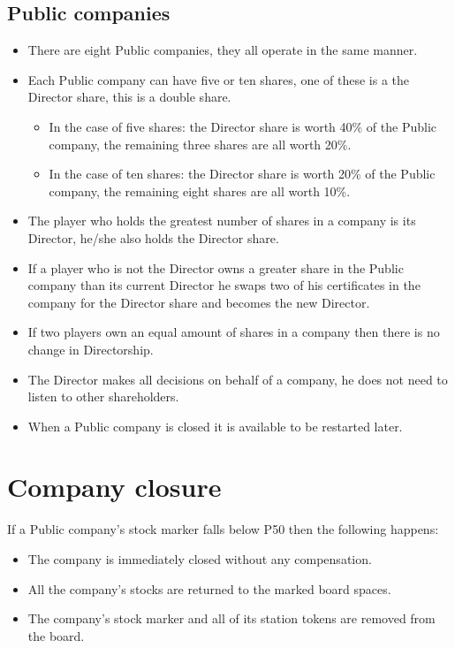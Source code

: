 \documentclass[a4paper]{article}
\begin{document}
\subsection{Public companies}
\begin{itemize}
	\item There are eight Public companies, they all operate in the same manner.
	\item Each Public company can have five or ten shares, one of these is a
	the Director share, this is a double share.
	\begin{itemize}
		\item In the case of five shares: the Director share is worth 40\% of
		the Public company, the remaining three shares are all worth 20\%.
		\item In the case of ten shares: the Director share is worth 20\% of
		the Public company, the remaining eight shares are all worth 10\%.
	\end{itemize}
	\item The player who holds the greatest number of shares in a company is its
	Director, he/she also holds the Director share.
	\item If a player who is not the Director owns a greater share in the Public
	company than its current Director he swaps two of his certificates in the
	company for the Director share and becomes the new Director.
	\item If two players own an equal amount of shares in a company then there
	is no change in Directorship.
	\item The Director makes all decisions on behalf of a company, he does not
	need to listen to other shareholders.
	\item When a Public company is closed it is available to be restarted later.
\end{itemize}

\section{Company closure}
If a Public company's stock marker falls below P50 then the following happens:
\begin{itemize}
	\item The company is immediately closed without any compensation.
	\item All the company's stocks are returned to the marked board spaces.
	\item The company's stock marker and all of its station tokens are removed
	from the board.
\end{itemize}
\end{document}
